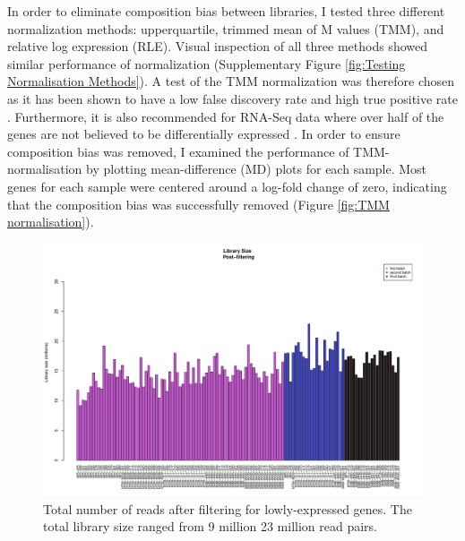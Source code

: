 \documentclass[12pt,a4paper,titlepage,twoside,openright]{book}
\begin{document}
\begin{mainmatter}
{{In order to eliminate composition bias between libraries, I tested three different normalization methods: upperquartile, trimmed mean of M values (TMM), and relative log expression (RLE). Visual inspection of all three methods showed similar performance of normalization (Supplementary Figure \ref{fig:Testing Normalisation Methods}). A test of the TMM normalization was therefore chosen as it has been shown to have a low false discovery rate and high true positive rate \cite{pereira2018comparison}. Furthermore, it is also recommended for RNA-Seq data where over half of the genes are not believed to be differentially expressed \cite{chen2014edger}. In order to ensure composition bias was removed, I examined the performance of TMM-normalisation by plotting mean-difference (MD) plots for each sample. Most genes for each sample were centered around a log-fold change of zero, indicating that the composition bias was successfully removed (﻿Figure \ref{fig:TMM normalisation}).

\begin{figure}[htb!]
\centering
\includegraphics[width=\textwidth,height=\textheight,keepaspectratio]{Figures/librarySize_indoRNA_postFiltering_123Combined.pdf}
\caption{Total number of reads after filtering for lowly-expressed genes. The total library size ranged from 9 million 23 million read pairs.}
\label{fig:library size}
\end{figure}
  

}}
\end{mainmatter}
\end{document}
